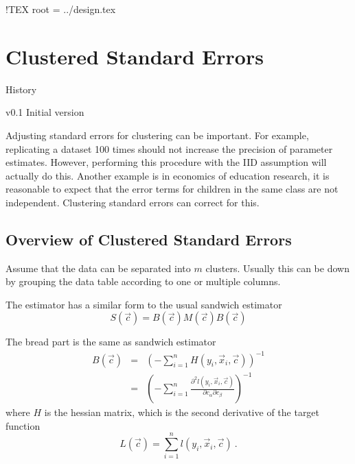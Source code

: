
!TEX root = ../design.tex

\chapter[Clustered Standard Errors]{Clustered Standard Errors}
\begin{moduleinfo}
\item[History]
  \begin{modulehistory}
    \item[v0.1] Initial version
    \end{modulehistory}
\end{moduleinfo}


Adjusting standard errors for clustering can be important. For
example, replicating a dataset 100 times should not increase the
precision of parameter estimates. However, performing this procedure
with the IID assumption will actually do this. Another example is in
economics of education research, it is reasonable to expect that the
error terms for children in the same class are not
independent. Clustering standard errors can correct for this.  

\section{Overview of Clustered Standard Errors}

Assume that the data can be separated into $m$ clusters. Usually this
can be down by grouping the data table according to one or multiple
columns.

The estimator has a similar form to the usual sandwich estimator
\begin{equation}
  S(\vec{c}) = B(\vec{c}) M(\vec{c}) B(\vec{c})
\end{equation}

The bread part is the same as sandwich estimator
\begin{eqnarray}
  B(\vec{c}) & = & \left(-\sum_{i=1}^{n} H(y_i, \vec{x}_i,
    \vec{c})\right)^{-1}\\
  & = & \left(-\sum_{i=1}^{n}\frac{\partial^2 l(y_i, \vec{x}_i,
      \vec{c})}{\partial c_\alpha \partial c_\beta}\right)^{-1}
\end{eqnarray}
where $H$ is the hessian matrix, which is the second derivative of the
target function 
\begin{equation}
  L(\vec{c}) = \sum_{i=1}^n l(y_i, \vec{x}_i, \vec{c})\ .
\end{equation}

